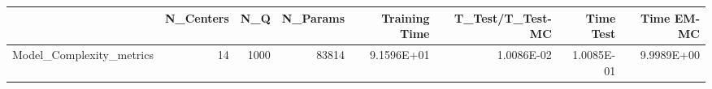 \begin{tabular}{lrrrrrrr}
\toprule
{} &  N\_Centers &   N\_Q &  N\_Params &  Training Time &  T\_Test/T\_Test-MC &  Time Test &  Time EM-MC \\
\midrule
Model\_Complexity\_metrics &         14 &  1000 &     83814 &     9.1596E+01 &        1.0086E-02 & 1.0085E-01 &  9.9989E+00 \\
\bottomrule
\end{tabular}
